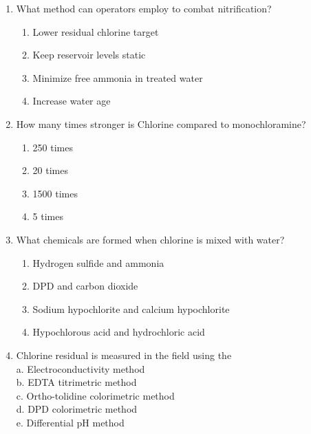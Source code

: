 \begin{enumerate}
\item  What method can operators employ to combat nitrification?\\
\begin{enumerate}
\item Lower residual chlorine target\\
\item Keep reservoir levels static\\
\item Minimize free ammonia in treated water\\
\item Increase water age
\end{enumerate}

\item  How many times stronger is Chlorine compared to monochloramine?\\
\begin{enumerate}
\item 250 times\\
\item 20 times\\
\item 1500 times\\
\item 5 times
\end{enumerate}

\item What chemicals are formed when chlorine is mixed with water?
\begin{enumerate}
\item Hydrogen sulfide and ammonia
\item DPD and carbon dioxide
\item Sodium hypochlorite and calcium hypochlorite
\item Hypochlorous acid and hydrochloric acid
\end{enumerate}

  \item Chlorine residual is measured in the field using the\\
a. Electroconductivity method\\
b. EDTA titrimetric method\\
c. Ortho-tolidine colorimetric method\\
d. DPD colorimetric method\\
e. Differential $\mathrm{pH}$ method\\


\end{enumerate}
